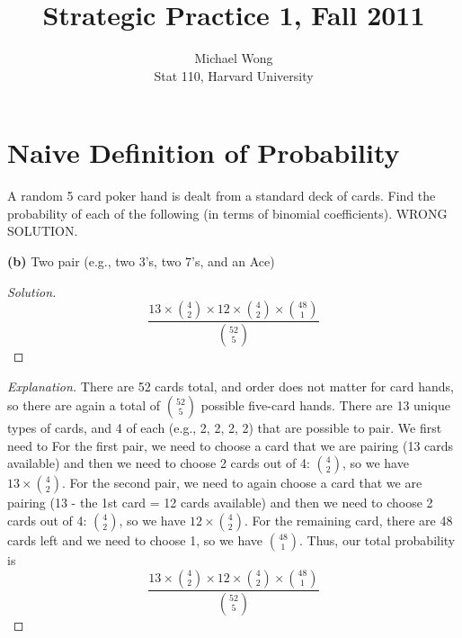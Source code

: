 \documentclass[10pt]{article}
\newenvironment{problem}[2][Problem]{\begin{trivlist}
\item[\hskip \labelsep {\bfseries #1}\hskip \labelsep {\bfseries #2.}]}{\end{trivlist}}
\begin{document}
 
\title{Strategic Practice 1, Fall 2011}
\author{Michael Wong\\
Stat 110, Harvard University}
\maketitle

\section{Naive Definition of Probability}


\begin{problem}{2} 
A random 5 card poker hand is dealt from a standard deck of cards. Find the probability of each of the following (in terms of binomial coefficients). WRONG SOLUTION. 
\end{problem}

\begin{question} 

\textbf{(b)} Two pair (e.g., two 3's, two 7's, and an Ace)

\end{question}

\begin{proof}[Solution]
\[
       \frac{13 \times \binom{4}{2} \times 12 \times \binom{4}{2} \times \binom{48}{1}}{\binom{52}{5}}
\]
\end{proof}

\begin{proof}[Explanation]

There are 52 cards total, and order does not matter for card hands, so there are again a total of \(\binom{52}{5}\) possible five-card hands. There are 13 unique types of cards, and 4 of each (e.g., 2, 2, 2, 2) that are possible to pair. We first need to For the first pair, we need to choose a card that we are pairing (13 cards available) and then we need to choose 2 cards out of 4: \(\binom{4}{2}\), so we have $13 \times \binom{4}{2}$. For the second pair, we need to again choose a card that we are pairing (13 - the 1st card = 12 cards available) and then we need to choose 2 cards out of 4: \(\binom{4}{2}\), so we have $12 \times \binom{4}{2}$. For the remaining card, there are 48 cards left and we need to choose 1, so we have $\binom{48}{1}$. Thus, our total probability is
\[
       \frac{13 \times \binom{4}{2} \times 12 \times \binom{4}{2} \times \binom{48}{1}}{\binom{52}{5}}
\]

\end{proof}
\end{document}
